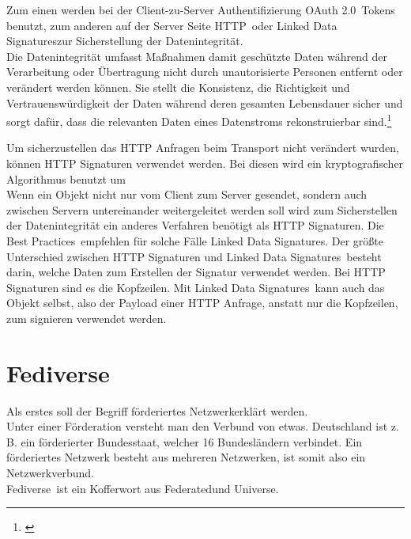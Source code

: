 	Zum einen werden bei der Client-zu-Server Authentifizierung \glqq OAuth 2.0\grqq~Tokens benutzt, zum anderen auf der Server Seite \glqq HTTP\grqq~oder \glqq Linked Data Signatures\grqq zur Sicherstellung der Datenintegrität.\\
	
	\glqq Die Datenintegrität umfasst Maßnahmen damit geschützte Daten während der Verarbeitung oder Übertragung nicht durch unautorisierte Personen entfernt oder verändert werden können. Sie stellt die Konsistenz, die Richtigkeit und Vertrauenswürdigkeit der Daten während deren gesamten Lebensdauer sicher und sorgt dafür, dass die relevanten Daten eines Datenstroms rekonstruierbar sind.\grqq\footnote{\cite{data-integrity}}
	
	Um sicherzustellen das HTTP Anfragen beim Transport nicht verändert wurden, können HTTP Signaturen verwendet werden. Bei diesen wird ein kryptografischer Algorithmus benutzt um \\
	Wenn ein Objekt nicht nur vom Client zum Server gesendet, sondern auch zwischen Servern untereinander weitergeleitet werden soll wird zum Sicherstellen der Datenintegrität ein anderes Verfahren benötigt als HTTP Signaturen. Die \glqq Best Practices\grqq~empfehlen für solche Fälle \glqq Linked Data Signatures\grqq. Der größte Unterschied zwischen HTTP Signaturen und \glqq Linked Data Signatures\grqq~besteht darin, welche Daten zum Erstellen der Signatur verwendet werden. Bei HTTP Signaturen sind es die Kopfzeilen. Mit \glqq Linked Data Signatures\grqq~kann auch das Objekt selbst, also der Payload einer HTTP Anfrage, anstatt nur die Kopfzeilen, zum signieren verwendet werden.

\section{Fediverse}
	Als erstes soll der Begriff \glqq förderiertes Netzwerk\grqq erklärt werden.\\
	Unter einer Förderation versteht man den Verbund von etwas. Deutschland ist z. B. ein förderierter Bundesstaat, welcher 16 Bundesländern verbindet. Ein förderiertes Netzwerk besteht aus mehreren Netzwerken, ist somit also ein Netzwerkverbund.\\
	
	\glqq Fediverse\grqq~ist ein Kofferwort aus \glqq Federated\grqq und \glqq Universe\grqq. 